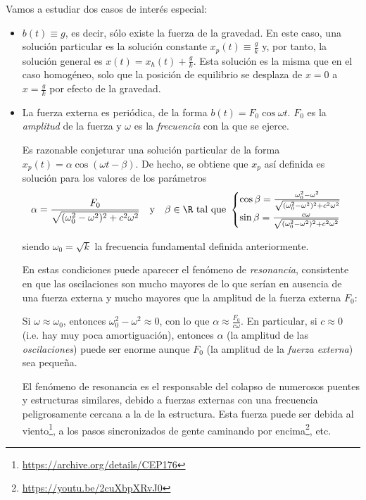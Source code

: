 \documentclass[../main.tex]{subfiles}
\begin{document}
  Vamos a estudiar dos casos de interés especial:

  \begin{itemize}
  \item \(b(t) \equiv g\), es decir, sólo existe la fuerza de la gravedad. En
    este caso, una solución particular es la solución constante \(x_p(t) \equiv
    \frac{g}{k}\) y, por tanto, la solución general es \(x(t) = x_h(t) +
    \frac{g}{k}\). Esta solución es la misma que en el caso homogéneo, solo que
    la posición de equilibrio se desplaza de \(x=0\) a \(x=\frac{g}{k}\) por
    efecto de la gravedad.
  \item La fuerza externa es periódica, de la forma
    \(b(t) = F_0 \cos \omega t\). \(F_0\) es la \emph{amplitud} de la fuerza y
    \(\omega\) es la \emph{frecuencia} con la que se ejerce.

    Es razonable conjeturar una solución particular de la forma \(x_p(t) =
    \alpha \cos (\omega t - \beta)\). De hecho, se obtiene que \(x_p\) así
    definida es solución para los valores de los parámetros
    \[\alpha = \frac{F_0}{\sqrt{(\omega_0^2-\omega^2)^2+c^2\omega^2}} \quad
      \text{y} \quad \beta \in \R \text{ tal que }
      \begin{cases}
        \cos \beta =
        \frac{\omega_0^2-\omega^2}{\sqrt{(\omega_0^2-\omega^2)^2+c^2\omega^2}} \\
        \sin \beta = \frac{c\omega}{\sqrt{(\omega_0^2-\omega^2)^2+c^2\omega^2}}
      \end{cases}
    \]

    siendo \(\omega_0 = \sqrt{k}\) la frecuencia fundamental definida
    anteriormente.

    En estas condiciones puede aparecer el fenómeno de \emph{resonancia},
    consistente en que las oscilaciones son mucho mayores de lo que serían en
    ausencia de una fuerza externa y mucho mayores que la amplitud de la fuerza
    externa \(F_0\):

    Si \(\omega \approx \omega_0\), entonces \(\omega_0^2-\omega^2 \approx 0\),
    con lo que \(\alpha \approx \frac{F_0}{c\omega}\). En particular, si
    \(c \approx 0\) (i.e. hay muy poca amortiguación), entonces \(\alpha\) (la
    amplitud de las \emph{oscilaciones}) puede ser enorme aunque \(F_0\) (la
    amplitud de la \emph{fuerza externa}) sea pequeña.

    El fenómeno de resonancia es el responsable del colapso de numerosos puentes
    y estructuras similares, debido a fuerzas externas con una frecuencia
    peligrosamente cercana a la de la estructura. Esta fuerza puede ser debida
    al viento\footnote{\url{https://archive.org/details/CEP176}}, a los pasos
    sincronizados de gente caminando por
    encima\footnote{\url{https://youtu.be/2cuXbpXRvJ0}}, etc.
  \end{itemize}
\end{document}
